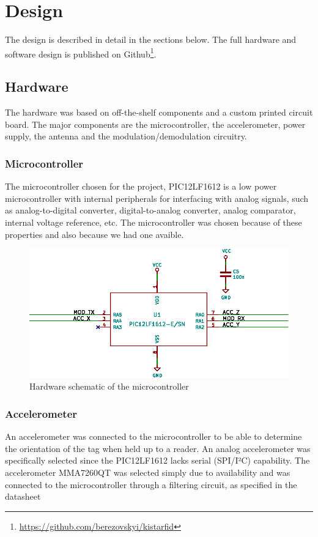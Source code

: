 \section{Design}
The design is described in detail in the sections below.
The full hardware and software design is published on Github\footnote{\url{https://github.com/berezovskyi/kistarfid}}.

\subsection{Hardware}
The hardware was based on off-the-shelf components and a custom printed circuit board.
The major components are the microcontroller, the accelerometer, power supply, the antenna and the modulation/demodulation circuitry.

\subsubsection{Microcontroller}
The microcontroller chosen for the project, PIC12LF1612 is a low power microcontroller with internal peripherals for interfacing with analog signals, such as analog-to-digital converter, digital-to-analog converter, analog comparator, internal voltage reference, etc\cite{pic}.
The microcontroller was chosen because of these properties and also because we had one avaible.

\begin{figure}[h!]
    \centering
    \includegraphics[scale=1.0]{res/schematic-pic.eps}
    \caption{Hardware schematic of the microcontroller}
    \label{fig:sch-pic}
\end{figure}

\subsubsection{Accelerometer}
An accelerometer was connected to the microcontroller to be able to determine the orientation of the tag when held up to a reader.
An analog accelerometer was specifically selected since the PIC12LF1612 lacks serial (SPI/I²C) capability.
The accelerometer MMA7260QT was selected simply due to availability and was connected to the microcontroller through a filtering circuit, as specified in the datasheet\cite{mma-acc}


